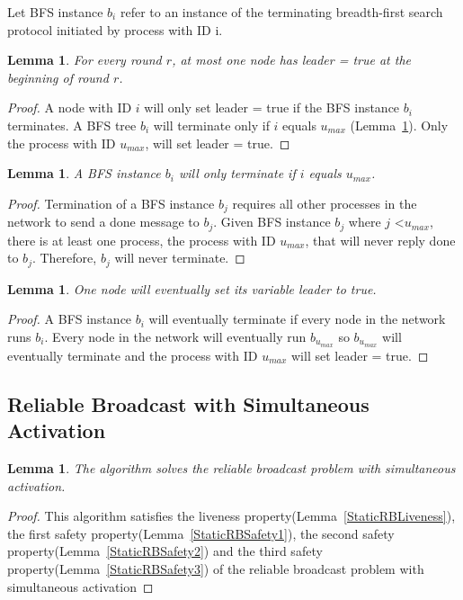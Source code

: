 \documentclass[english]{article}
\newtheorem{lemma}[theorem]{Lemma}
\begin{document}
\begin{definition}
Let BFS instance $b_i$ refer to an instance of the terminating breadth-first search protocol initiated by process with ID i.
\end{definition}

\begin{lemma}
\label{LESafetyStatic}
For every round $r$, at most one node has leader = true at the beginning of round $r$.
\end{lemma}
\begin{proof}

A node with ID $i$ will only set leader = true if the BFS instance $b_i$ terminates.
A BFS tree $b_i$ will terminate only if $i$ equals $u_{max}$ (Lemma~\ref{BFSTermination}).
Only the process with ID $u_{max}$, will set leader = true. 

\end{proof}

\begin{lemma}
\label{BFSTermination}
  A BFS instance $b_i$ will only terminate if $i$ equals $u_{max}$.
\end{lemma}

\begin{proof}
Termination of a BFS instance $b_j$ requires all other processes in the network to send a done message to $b_j$.
Given BFS instance $b_j$ where $j$ \textless $u_{max}$, there is at least one process, the process with ID $u_{max}$, that will never reply done to $b_j$.
Therefore, $b_j$ will never terminate.
\end{proof}

\begin{lemma}
\label{LELivenessStatic}
  One node will eventually set its variable leader to true.
\end{lemma}
\begin{proof}
A BFS instance $b_i$ will eventually terminate if every node in the network runs $b_i$. 
Every node in the network will eventually run $b_{u_{max}}$ so $b_{u_{max}}$ will eventually terminate and the process with ID $u_{max}$ will set leader = true.
\end{proof}

\subsection {Reliable Broadcast with Simultaneous Activation}

\begin{lemma}
\label{StaticReliableBroadcast}
The algorithm solves the reliable broadcast problem with simultaneous activation.
\end{lemma}
\begin{proof}
This algorithm satisfies the liveness property(Lemma~\ref{StaticRBLiveness}), 
the first safety property(Lemma~\ref{StaticRBSafety1}),
the second safety property(Lemma~\ref{StaticRBSafety2}) and 
the third safety property(Lemma~\ref{StaticRBSafety3}) of the reliable broadcast problem with simultaneous activation
\end{proof}
\end{document}
